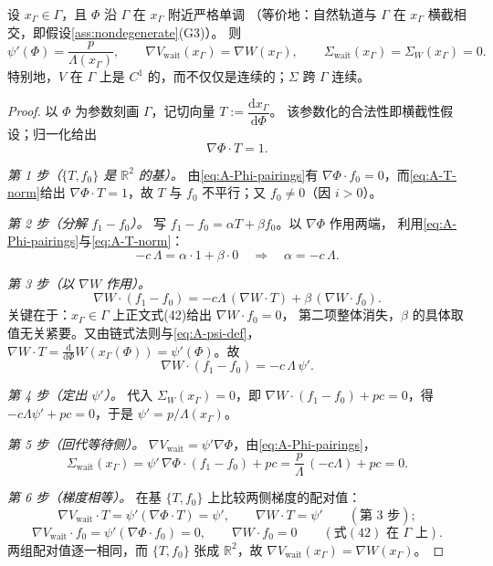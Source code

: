 \begin{lemma}[切换曲线上的梯度匹配]
\label{lem:grad-match}
设 $x_\Gamma\in\Gamma$，且 $\Phi$ 沿 $\Gamma$ 在 $x_\Gamma$ 附近严格单调
（等价地：自然轨道与 $\Gamma$ 在 $x_\Gamma$ 横截相交，即假设\ref{ass:nondegenerate}(G3)）。
则
\begin{equation}
  \psi'(\Phi)=\frac{p}{\Lambda(x_\Gamma)},
  \qquad
  \nabla V_{\mathrm{wait}}(x_\Gamma)=\nabla W(x_\Gamma),
  \qquad
  \Sigma_{\mathrm{wait}}(x_\Gamma)=\Sigma_W(x_\Gamma)=0 .
  \label{eq:A-grad-match}
\end{equation}
特别地，$V$ 在 $\Gamma$ 上是 $C^1$ 的，而不仅仅是连续的；$\Sigma$ 跨 $\Gamma$ 连续。
\end{lemma}

\begin{proof}
以 $\Phi$ 为参数刻画 $\Gamma$，记切向量 $T:=\dfrac{\mathrm{d}x_\Gamma}{\mathrm{d}\Phi}$。
该参数化的合法性即横截性假设；归一化给出
\begin{equation}
  \nabla\Phi\cdot T=1 .
  \label{eq:A-T-norm}
\end{equation}

\emph{第 1 步（$\{T,f_0\}$ 是 $\mathbb{R}^2$ 的基）。}
由\eqref{eq:A-Phi-pairings}有 $\nabla\Phi\cdot f_0=0$，而\eqref{eq:A-T-norm}给出
$\nabla\Phi\cdot T=1$，故 $T$ 与 $f_0$ 不平行；又 $f_0\neq0$（因 $i>0$）。

\emph{第 2 步（分解 $f_1-f_0$）。}
写 $f_1-f_0=\alpha T+\beta f_0$。以 $\nabla\Phi$ 作用两端，
利用\eqref{eq:A-Phi-pairings}与\eqref{eq:A-T-norm}：
\begin{equation}
  -c\,\Lambda=\alpha\cdot 1+\beta\cdot 0
  \quad\Longrightarrow\quad
  \alpha=-c\,\Lambda .
  \label{eq:A-alpha}
\end{equation}

\emph{第 3 步（以 $\nabla W$ 作用）。}
\[
  \nabla W\cdot(f_1-f_0)=-c\Lambda\,(\nabla W\cdot T)+\beta\,(\nabla W\cdot f_0).
\]
关键在于：$x_\Gamma\in\Gamma$ 上正文式(42)给出 $\nabla W\cdot f_0=0$，
第二项整体消失，$\beta$ 的具体取值无关紧要。又由链式法则与\eqref{eq:A-psi-def}，
$\nabla W\cdot T=\frac{\mathrm{d}}{\mathrm{d}\Phi}W(x_\Gamma(\Phi))=\psi'(\Phi)$。故
\[
  \nabla W\cdot(f_1-f_0)=-c\,\Lambda\,\psi' .
\]

\emph{第 4 步（定出 $\psi'$）。}
代入 $\Sigma_W(x_\Gamma)=0$，即 $\nabla W\cdot(f_1-f_0)+pc=0$，得
$-c\Lambda\psi'+pc=0$，于是 $\psi'=p/\Lambda(x_\Gamma)$。

\emph{第 5 步（回代等待侧）。}
$\nabla V_{\mathrm{wait}}=\psi'\nabla\Phi$，由\eqref{eq:A-Phi-pairings}，
\[
  \Sigma_{\mathrm{wait}}(x_\Gamma)
  =\psi'\,\nabla\Phi\cdot(f_1-f_0)+pc
  =\frac{p}{\Lambda}\,(-c\Lambda)+pc=0 .
\]

\emph{第 6 步（梯度相等）。}
在基 $\{T,f_0\}$ 上比较两侧梯度的配对值：
\[
  \nabla V_{\mathrm{wait}}\cdot T=\psi'(\nabla\Phi\cdot T)=\psi',
  \qquad
  \nabla W\cdot T=\psi'
  \qquad(\text{第 3 步});
\]
\[
  \nabla V_{\mathrm{wait}}\cdot f_0=\psi'(\nabla\Phi\cdot f_0)=0,
  \qquad
  \nabla W\cdot f_0=0
  \qquad(\text{式}(42)\text{ 在 }\Gamma\text{ 上}).
\]
两组配对值逐一相同，而 $\{T,f_0\}$ 张成 $\mathbb{R}^2$，故
$\nabla V_{\mathrm{wait}}(x_\Gamma)=\nabla W(x_\Gamma)$。
\end{proof}

